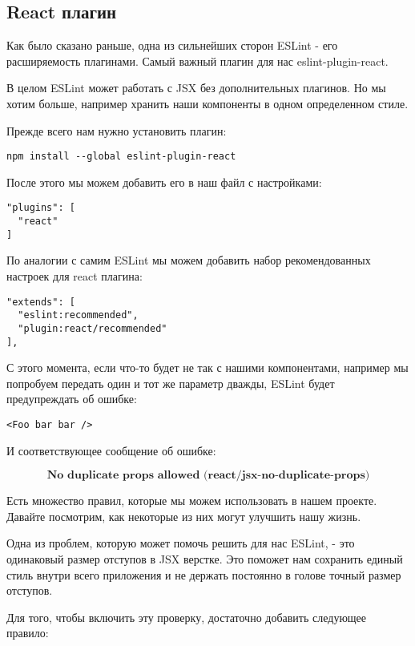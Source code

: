 \subsection{React плагин}

Как было сказано раньше, одна из сильнейших сторон ESLint - его расширяемость плагинами. Самый важный плагин для нас eslint-plugin-react.

В целом ESLint может работать с JSX без дополнительных плагинов. Но мы хотим больше, например хранить наши компоненты в одном определенном стиле.

Прежде всего нам нужно установить плагин:

\begin{lstlisting}
npm install --global eslint-plugin-react
\end{lstlisting}
   
После этого мы можем добавить его в наш файл с настройками:

\begin{lstlisting}
"plugins": [
  "react"
]
\end{lstlisting}

По аналогии с самим ESLint мы можем добавить набор рекомендованных настроек для react плагина:

\begin{lstlisting}
"extends": [
  "eslint:recommended",
  "plugin:react/recommended"
],
\end{lstlisting}

С этого момента, если что-то будет не так с нашими компонентами, например мы попробуем передать один и тот же параметр дважды, ESLint будет предупреждать об ошибке:

\begin{lstlisting}
<Foo bar bar />
\end{lstlisting}

И соответствующее сообщение об ошибке:

$$
\textbf{No duplicate props allowed (react/jsx-no-duplicate-props)}
$$

Есть множество правил, которые мы можем использовать в нашем проекте. Давайте посмотрим, как некоторые из них могут улучшить нашу жизнь.

Одна из проблем, которую может помочь решить для нас ESLint, - это одинаковый размер отступов в JSX верстке. Это поможет нам сохранить единый стиль внутри всего приложения и не держать постоянно в голове точный размер отступов.

Для того, чтобы включить эту проверку, достаточно добавить следующее правило:

